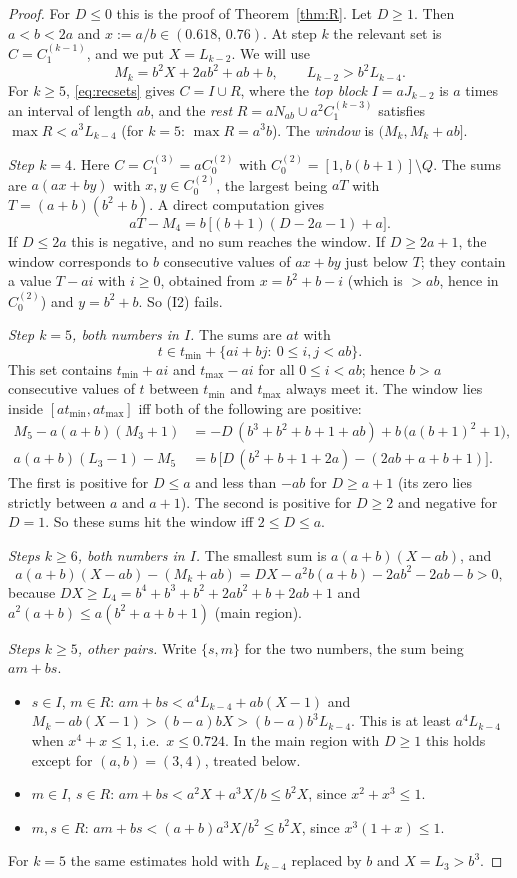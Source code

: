 \documentclass[11pt,a4paper]{article}
\theoremstyle{definition}
\theoremstyle{remark}
\begin{document}
\begin{proof}
For $D\le0$ this is the proof of Theorem~\ref{thm:R}. Let $D\ge1$. Then $a<b<2a$ and $x:=a/b\in(0.618,\,0.76)$. At step $k$ the relevant set is $C=C_1^{(k-1)}$, and we put $X=L_{k-2}$. We will use
\[
  M_k=b^2X+2ab^2+ab+b,\qquad L_{k-2}>b^2L_{k-4}.
\]
For $k\ge5$, \eqref{eq:recsets} gives $C=I\cup R$, where the \emph{top block} $I=aJ_{k-2}$ is $a$ times an interval of length $ab$, and the \emph{rest} $R=aN_{ab}\cup a^2C_1^{(k-3)}$ satisfies $\max R<a^3L_{k-4}$ (for $k=5$: $\max R=a^3b$). The \emph{window} is $(M_k,M_k+ab]$.

\medskip\noindent\emph{Step $k=4$.} Here $C=C_1^{(3)}=aC_0^{(2)}$ with $C_0^{(2)}=[1,b(b+1)]\setminus Q$. The sums are $a(ax+by)$ with $x,y\in C_0^{(2)}$, the largest being $aT$ with $T=(a+b)(b^2+b)$. A direct computation gives
\[
  aT-M_4=b\,\bigl[(b+1)(D-2a-1)+a\bigr].
\]
If $D\le2a$ this is negative, and no sum reaches the window. If $D\ge2a+1$, the window corresponds to $b$ consecutive values of $ax+by$ just below $T$; they contain a value $T-ai$ with $i\ge0$, obtained from $x=b^2+b-i$ (which is $>ab$, hence in $C_0^{(2)}$) and $y=b^2+b$. So (I2) fails.

\medskip\noindent\emph{Step $k=5$, both numbers in $I$.} The sums are $at$ with
\[
  t\in t_{\min}+\{ai+bj:\ 0\le i,j<ab\}.
\]
This set contains $t_{\min}+ai$ and $t_{\max}-ai$ for all $0\le i<ab$; hence $b>a$ consecutive values of $t$ between $t_{\min}$ and $t_{\max}$ always meet it. The window lies inside $[at_{\min},at_{\max}]$ iff both of the following are positive:
\begin{align*}
  M_5-a(a+b)(M_3+1) &= -D\,(b^3+b^2+b+1+ab)+b\,\bigl(a(b+1)^2+1\bigr),\\
  a(a+b)(L_3-1)-M_5 &= b\,\bigl[D\,(b^2+b+1+2a)-(2ab+a+b+1)\bigr].
\end{align*}
The first is positive for $D\le a$ and less than $-ab$ for $D\ge a+1$ (its zero lies strictly between $a$ and $a+1$). The second is positive for $D\ge2$ and negative for $D=1$. So these sums hit the window iff $2\le D\le a$.

\medskip\noindent\emph{Steps $k\ge6$, both numbers in $I$.} The smallest sum is $a(a+b)(X-ab)$, and
\[
  a(a+b)(X-ab)-(M_k+ab)=DX-a^2b(a+b)-2ab^2-2ab-b>0,
\]
because $DX\ge L_4=b^4+b^3+b^2+2ab^2+b+2ab+1$ and $a^2(a+b)\le a(b^2+a+b+1)$ (main region).

\medskip\noindent\emph{Steps $k\ge5$, other pairs.} Write $\{s,m\}$ for the two numbers, the sum being $am+bs$.
\begin{itemize}
\item $s\in I$, $m\in R$: $am+bs<a^4L_{k-4}+ab(X-1)$ and $M_k-ab(X-1)>(b-a)bX>(b-a)b^3L_{k-4}$. This is at least $a^4L_{k-4}$ when $x^4+x\le1$, i.e.\ $x\le0.724$. In the main region with $D\ge1$ this holds except for $(a,b)=(3,4)$, treated below.
\item $m\in I$, $s\in R$: $am+bs<a^2X+a^3X/b\le b^2X$, since $x^2+x^3\le1$.
\item $m,s\in R$: $am+bs<(a+b)a^3X/b^2\le b^2X$, since $x^3(1+x)\le1$.
\end{itemize}
For $k=5$ the same estimates hold with $L_{k-4}$ replaced by $b$ and $X=L_3>b^3$.


\end{proof}
\end{document}
